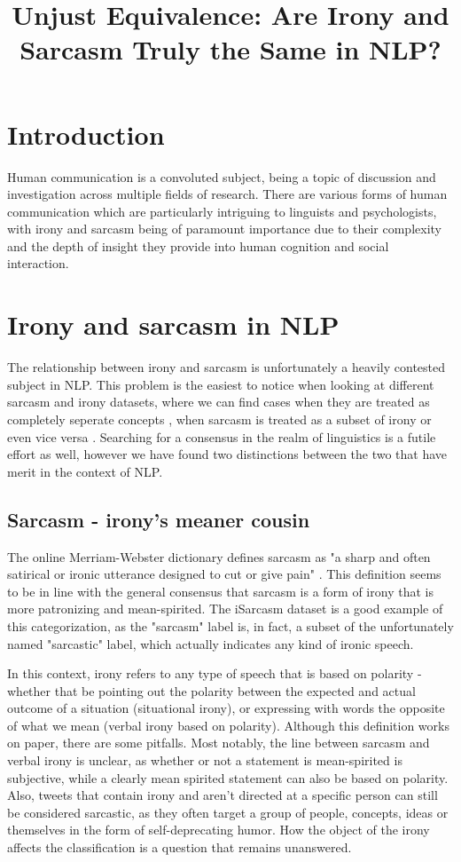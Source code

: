 \documentclass[10pt, a4paper]{article}
\title{Unjust Equivalence: Are Irony and Sarcasm Truly the Same in NLP?}
\begin{document}
\maketitleabstract

\section{Introduction}

Human communication is a convoluted subject, being a topic of discussion and investigation across multiple fields of research.
There are various forms of human communication which are particularly intriguing to linguists and psychologists, 
with irony and sarcasm being of paramount importance due to their complexity and the depth of insight they provide 
into human cognition and social interaction.

\section{Irony and sarcasm in NLP}
The relationship between irony and sarcasm is unfortunately a heavily contested subject in NLP. This problem is the easiest
to notice when looking at different sarcasm and irony datasets, where we can find cases when they are treated as completely
seperate concepts \citep{kaggle-tweets}, when sarcasm is treated as a subset of irony \citep{semeval-2018} or even vice
versa \citep{iSarcasm}. Searching for a consensus in the realm of linguistics is a futile effort as well, however we have 
found two distinctions between the two that have merit in the context of NLP.

\subsection{Sarcasm - irony's meaner cousin}
The online Merriam-Webster dictionary defines sarcasm as "a sharp and often satirical or ironic utterance designed to 
cut or give pain" \citep{mw-dictionary}. This definition seems to be in line with the general consensus that sarcasm is
a form of irony that is more patronizing and mean-spirited. The iSarcasm dataset \citep{iSarcasm} is a good example of this 
categorization, as the "sarcasm" label is, in fact, a subset of the unfortunately named "sarcastic" label, which actually 
indicates any kind of ironic speech. 

In this context, irony refers to any type of speech that is based on polarity - whether that be pointing out the polarity 
between the expected and actual outcome of a situation (situational irony), or expressing with words the opposite of what 
we mean (verbal irony based on polarity). Although this definition works on paper, there are some pitfalls. Most notably, 
the line between sarcasm and verbal irony is unclear, as whether or not a statement is mean-spirited is subjective, while 
a clearly mean spirited statement can also be based on polarity. Also, tweets that contain irony and aren’t directed at a 
specific person can still be considered sarcastic, as they often target a group of people, concepts, ideas or themselves 
in the form of self-deprecating humor. How the object of the irony affects the classification is a question that remains unanswered.
\end{document}
